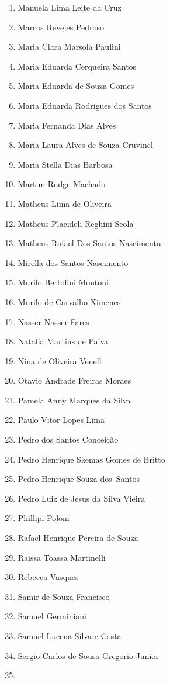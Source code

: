 \documentclass[
  letterpaper,
  DIV=11,
  numbers=noendperiod]{scrreprt}
\begin{document}
\begin{enumerate}
\item
  Manuela Lima Leite da Cruz
\item
  Marcos Revejes Pedroso
\item
  Maria Clara Marsola Paulini
\item
  Maria Eduarda Cerqueira Santos
\item
  Maria Eduarda de Souza Gomes
\item
  Maria Eduarda Rodrigues dos Santos
\item
  ⁠Maria Fernanda Dias Alves
\item
  Maria Laura Alves de Souza Cruvinel
\item
  Maria Stella Dias Barbosa
\item
  Martim Rudge Machado
\item
  Matheus Lima de Oliveira
\item
  Matheus Placideli Reghini Scola
\item
  Matheus Rafael Dos Santos Nascimento
\item
  Mirella dos Santos Nascimento
\item
  Murilo Bertolini Montoni
\item
  Murilo de Carvalho Ximenes
\item
  Nasser Nasser Fares
\item
  Natalia Martins de Paiva
\item
  Nina de Oliveira Venell
\item
  Otavio Andrade Freiras Moraes
\item
  Pamela Anny Marques da Silva
\item
  Paulo Vitor Lopes Lima
\item
  Pedro dos Santos Conceição
\item
  Pedro Henrique Skemas Gomes de Britto
\item
  Pedro Henrique Souza dos~Santos
\item
  Pedro Luiz de Jesus da Silva Vieira
\item
  Phillipi Poloni
\item
  Rafael Henrique Pereira de Souza
\item
  Raissa Toassa Martinelli
\item
  Rebecca Vasques
\item
  Samir de Souza Francisco
\item
  Samuel Germiniani
\item
  Samuel Lucena Silva e Costa
\item
  Sergio Carlos de Sousa Gregorio Junior
\item

\end{enumerate}
\end{document}
